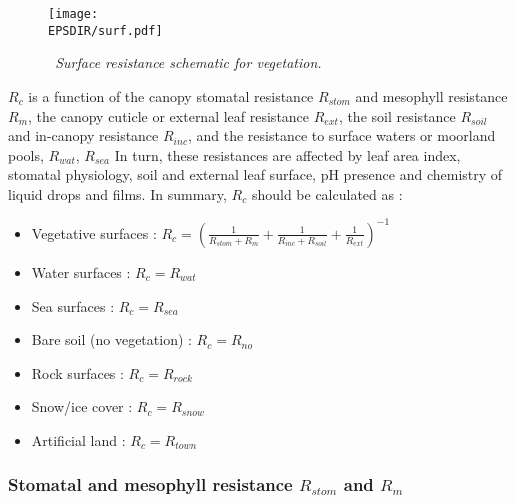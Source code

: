 \begin{figure}[htb]
\centerline{\texttt{[image: \\EPSDIR/surf.pdf]}}
\caption{\sl ~{Surface resistance schematic for vegetation.}}
\label{schema2}
\end{figure}
$R_c$ is a function of the canopy stomatal resistance $R_{stom}$ and mesophyll
resistance $R_m$, the canopy cuticle or external leaf resistance $R_{ext}$, the
soil resistance $R_{soil}$ and in-canopy resistance $R_{inc}$, 
and the resistance
to surface waters or moorland pools, $R_{wat}$, $R_{sea}$ \citep{Erisman1994}
In turn, these resistances are affected by leaf area index, stomatal
physiology, soil and external leaf surface, pH presence and chemistry of
liquid drops and films.
In summary, $R_c$ should be calculated as \cite{Erisman1994}:
\begin{itemize}
\item Vegetative surfaces :
$
R_c= \left(\frac{1}{R_{stom}+R_m}+\frac{1}{R_{inc}+R_{soil}} + \frac{1}{R_{ext}} \right)^{-1} 
$
\item Water surfaces : $R_c=R_{wat}$
\item Sea surfaces : $R_c=R_{sea}$ 
\item Bare soil (no vegetation) : $R_c=R_{no}$
\item Rock surfaces : $R_c=R_{rock}$
\item Snow/ice  cover : $R_c=R_{snow}$
\item Artificial land : $R_c=R_{town}$

\end{itemize}
\subsubsection*{Stomatal and mesophyll resistance $R_{stom}$ and $R_m$}

